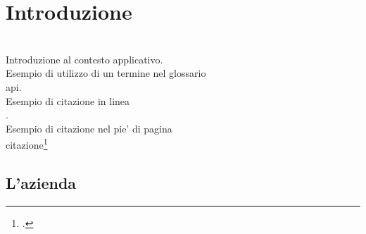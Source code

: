 \chapter{Introduzione}
\label{cap:introduzione}

\\

\noindent Introduzione al contesto applicativo.\\

\noindent Esempio di utilizzo di un termine nel glossario \\
\gls{api}. \\

\noindent Esempio di citazione in linea \\
\cite{site:agile-manifesto}. \\

\noindent Esempio di citazione nel pie' di pagina \\
citazione\footcite{book:lean-thinking} \\

\section{L'azienda}

